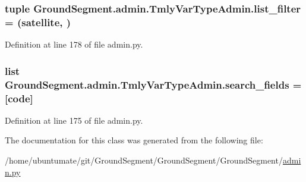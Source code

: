 \subsubsection[{list\+\_\+filter}]{\setlength{\rightskip}{0pt plus 5cm}tuple Ground\+Segment.\+admin.\+Tmly\+Var\+Type\+Admin.\+list\+\_\+filter = (\textquotesingle{}satellite\textquotesingle{}, )\hspace{0.3cm}{\ttfamily [static]}}\label{class_ground_segment_1_1admin_1_1_tmly_var_type_admin_ae6c46f02641f1897cceac59963725ab4}


Definition at line 178 of file admin.\+py.

\hypertarget{class_ground_segment_1_1admin_1_1_tmly_var_type_admin_aa4fbcc6eced9e293ccee1adc138c4728}{}
\subsubsection[{search\+\_\+fields}]{\setlength{\rightskip}{0pt plus 5cm}list Ground\+Segment.\+admin.\+Tmly\+Var\+Type\+Admin.\+search\+\_\+fields = \mbox{[}\textquotesingle{}code\textquotesingle{}\mbox{]}\hspace{0.3cm}{\ttfamily [static]}}\label{class_ground_segment_1_1admin_1_1_tmly_var_type_admin_aa4fbcc6eced9e293ccee1adc138c4728}


Definition at line 175 of file admin.\+py.



The documentation for this class was generated from the following file\+:\begin{DoxyCompactItemize}
\item 
/home/ubuntumate/git/\+Ground\+Segment/\+Ground\+Segment/\+Ground\+Segment/\hyperlink{admin_8py}{admin.\+py}\end{DoxyCompactItemize}
